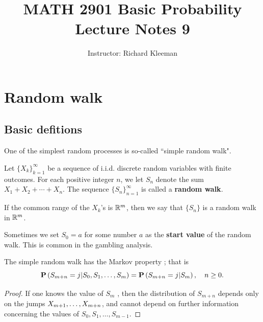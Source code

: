 


\title{MATH 2901 Basic Probability Lecture Notes 9}
\author{Instructor: Richard Kleeman}
\date{}
\maketitle


\section{Random walk}
\subsection{Basic defitions}

One of the simplest random processes is so-called ``simple 
random walk". 

\begin{definition}
Let $\{X_k\}_{k=1}^\infty$ be a sequence of i.i.d. discrete random variables with finite outcomes. For each positive integer $n$, we let $S_n$ denote the sum $X_1 +X_2 + \cdots + X_n$. The sequence $\{S_n\}_{n=1}^\infty$ is called a \textbf{random walk}.
\end{definition}

\begin{remark}
If the common range of the $X_k$’s is $\mathbb{R}^m$, then we say that $\{S_n\}$ is a random walk in $\mathbb{R}^m$.
\end{remark}

\begin{remark}
Sometimes we set $S_0 = a$ for some number $a$ as the \textbf{start value} of the random walk. This is common in the gambling analysis.
\end{remark}

\begin{lemma}
The simple random walk has the Markov property ; that is
\begin{equation*}
    \mathbf{P}\left(S_{m+n}=j | S_{0}, S_{1}, \ldots, S_{m}\right)=\mathbf{P}\left(S_{m+n}=j | S_{m}\right), \quad n \geq 0.
\end{equation*}
\end{lemma}

\begin{proof}
If one knows the value of $S_m$ , then the distribution of $S_{m+n}$ depends only on the jumps $X_{m+ 1} ,\dots, \\ X_{m+n}$, and cannot depend on further information concerning the values of $S_0, S_1, \dots , S_{m-1}$.
\end{proof}

